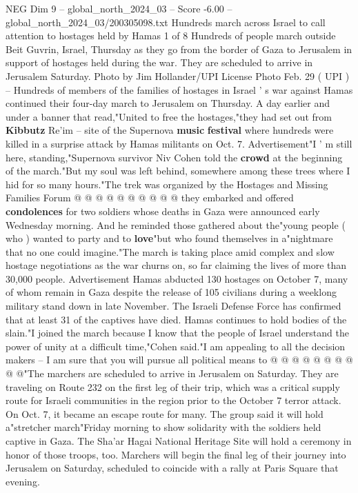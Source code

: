 \begin{textsample}{NEG Dim 9 – global\_north\_2024\_03 – Score -6.00 – global\_north\_2024\_03/200305098.txt}  \label{ex:f9_neg_245}
Hundreds march across Israel to call attention to hostages held by Hamas 1 of 8 Hundreds of people march outside Beit Guvrin, Israel, Thursday as they go from the border of Gaza to Jerusalem in support of hostages held during the war.
They are scheduled to arrive in Jerusalem Saturday.
Photo by Jim Hollander/UPI License Photo Feb. 29 ( UPI ) -- Hundreds of members of the families of hostages in Israel ' s war against Hamas continued their four-day march to Jerusalem on Thursday.
A day earlier and under a banner that read,"United to free the hostages,"they had set out from \textbf{Kibbutz} Re'im -- site of the Supernova \textbf{music} \textbf{festival} where hundreds were killed in a surprise attack by Hamas militants on Oct. 7.
Advertisement"I ' m still here, standing,"Supernova survivor Niv Cohen told the \textbf{crowd} at the beginning of the march."But my soul was left behind, somewhere among these trees where I hid for so many hours."The trek was organized by the Hostages and Missing Families Forum @ @ @ @ @ @ @ @ @ @ they embarked and offered \textbf{condolences} for two soldiers whose deaths in Gaza were announced early Wednesday morning.
And he reminded those gathered about the"young people ( who ) wanted to party and to \textbf{love}"but who found themselves in a"nightmare that no one could imagine."The march is taking place amid complex and slow hostage negotiations as the war churns on, so far claiming the lives of more than 30,000 people.
Advertisement Hamas abducted 130 hostages on October 7, many of whom remain in Gaza despite the release of 105 civilians during a weeklong military stand down in late November.
The Israeli Defense Force has confirmed that at least 31 of the captives have died.
Hamas continues to hold bodies of the slain."I joined the march because I know that the people of Israel understand the power of unity at a difficult time,"Cohen said."I am appealing to all the decision makers -- I am sure that you will pursue all political means to @ @ @ @ @ @ @ @ @ @"The marchers are scheduled to arrive in Jerusalem on Saturday.
They are traveling on Route 232 on the first leg of their trip, which was a critical supply route for Israeli communities in the region prior to the October 7 terror attack.
On Oct. 7, it became an escape route for many.
The group said it will hold a"stretcher march"Friday morning to show solidarity with the soldiers held captive in Gaza.
The Sha'ar Hagai National Heritage Site will hold a ceremony in honor of those troops, too.
Marchers will begin the final leg of their journey into Jerusalem on Saturday, scheduled to coincide with a rally at Paris Square that evening.

\end{textsample}
